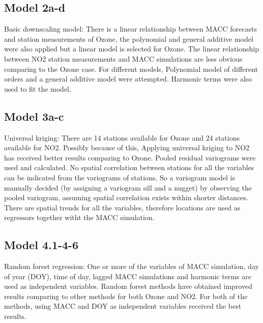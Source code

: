 \documentclass{article}
\begin{document}
\subsection{Model 2a-d}  
Basic downscaling model: There is a linear relationship between MACC forecasts and station measurements of Ozone, the polynomial and general additive model were also applied but a linear model is selected for Ozone. The linear relationship between NO2 station measurements and MACC simulations are less obvious comparing to the Ozone case. For different models, Polynomial model of different orders and a general additive model were attempted. Harmonic terms were also used to fit the model.  

\subsection{Model 3a-c}  
Universal kriging: There are 14 stations available for Ozone and 24 stations available for NO2. Possibly because of this, Applying universal kriging to NO2 has received better results comparing to Ozone. Pooled residual variograms were used and calculated. No spatial correlation between stations for all the variables can be indicated from the variograms of stations. So a variogram model is manually decided (by assigning a variogram sill and a nugget) by observing the pooled variogram, assuming spatial correlation exists within shorter distances. There are spatial trends for all the variables, therefore locations are used as regressors together witht the MACC simulation.  

\subsection{Model 4.1-4-6}  
Random forest regression: One or more of the variables of MACC simulation, day of year (DOY), time of day, lagged MACC simulations and harmonic terms are used as independent variables. Random forest methods have obtained improved results comparing to other methods for both Ozone and NO2. For both of the methods, using MACC and DOY as independent variables received the best results.   
\end{document}
